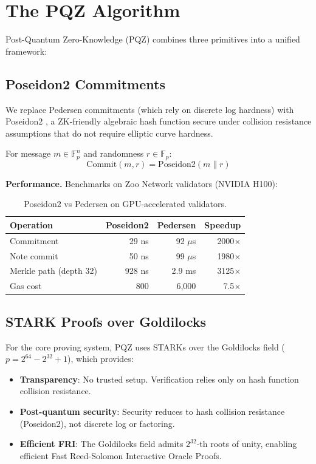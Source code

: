 \section{The PQZ Algorithm}


Post-Quantum Zero-Knowledge (PQZ) combines three primitives into a unified framework:

\subsection{Poseidon2 Commitments}

We replace Pedersen commitments (which rely on discrete log hardness) with Poseidon2 \cite{grassi2023poseidon2}, a ZK-friendly algebraic hash function secure under collision resistance assumptions that do not require elliptic curve hardness.

\begin{definition}
For message $m \in \mathbb{F}_p^n$ and randomness $r \in \mathbb{F}_p$:
$$\text{Commit}(m, r) = \text{Poseidon2}(m \| r)$$
\end{definition}

\textbf{Performance.} Benchmarks on Zoo Network validators (NVIDIA H100):

\begin{table}[h]
\centering
\begin{tabular}{lrrr}
\toprule
\textbf{Operation} & \textbf{Poseidon2} & \textbf{Pedersen} & \textbf{Speedup} \\
\midrule
Commitment & 29 ns & 92 $\mu$s & 2000$\times$ \\
Note commit & 50 ns & 99 $\mu$s & 1980$\times$ \\
Merkle path (depth 32) & 928 ns & 2.9 ms & 3125$\times$ \\
Gas cost & 800 & 6,000 & 7.5$\times$ \\
\bottomrule
\end{tabular}
\caption{Poseidon2 vs Pedersen on GPU-accelerated validators.}
\end{table}

\subsection{STARK Proofs over Goldilocks}

For the core proving system, PQZ uses STARKs over the Goldilocks field ($p = 2^{64} - 2^{32} + 1$), which provides:

\begin{itemize}
\item \textbf{Transparency}: No trusted setup. Verification relies only on hash function collision resistance.
\item \textbf{Post-quantum security}: Security reduces to hash collision resistance (Poseidon2), not discrete log or factoring.
\item \textbf{Efficient FRI}: The Goldilocks field admits $2^{32}$-th roots of unity, enabling efficient Fast Reed-Solomon Interactive Oracle Proofs.
\end{itemize}

